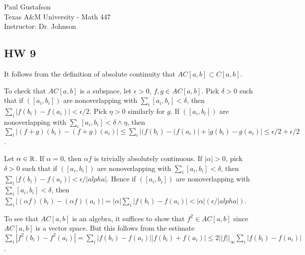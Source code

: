 \documentclass{article}
\begin{document}
\noindent Paul Gustafson\\
\noindent Texas A\&M University - Math 447\\ 
\noindent Instructor: Dr. Johnson

\subsection*{HW 9}
 It follows from the definition of absolute continuity that $AC[a,b] \subset C[a,b]$. 

To check that $AC[a,b]$ is a subspace, let $\epsilon > 0$, $f,g \in AC[a,b]$.  Pick $\delta > 0$ such that if $([a_i,b_i])$ are nonoverlapping with $\sum_i [a_i, b_i] < \delta$, then $\sum_i |f(b_i) - f(a_i)| < \epsilon/2$. Pick $\eta > 0$ similarly for $g$. If $([a_i,b_i])$ are nonoverlapping with $\sum_i [a_i, b_i] < \delta \wedge \eta$, then 
$\sum_i |(f+g)(b_i) - (f+g)(a_i)|
\le \sum_i |(f(b_i) - (f(a_i)| + |g(b_i) - g(a_i)|
\le \epsilon/2 + \epsilon/2$.

Let $\alpha \in \mathbb{R}$. If $\alpha = 0$, then $\alpha f$ is trivially absolutely continuous.  If $|\alpha| > 0$, pick $\delta > 0$ such that if $([a_i,b_i])$ are nonoverlapping with $\sum_i [a_i, b_i] < \delta$, then $\sum_i |f(b_i) - f(a_i)| < \epsilon/|alpha|$.  Hence if $([a_i,b_i])$ are nonoverlapping with $\sum_i [a_i, b_i] < \delta$, then $\sum_i |(\alpha f)(b_i) - (\alpha f)(a_i)| = |\alpha| \sum_i |f(b_i) - f(a_i)| < |\alpha| (\epsilon/|alpha|)$.

To see that $AC[a,b]$ is an algebra, it suffices to show that $f^2 \in AC[a,b]$ since $AC[a,b]$ is a vector space. But this follows from the estimate $\sum_i |f^2(b_i) - f^2(a_i)| = \sum_i |f(b_i) - f(a_i)| |f(b_i) + f(a_i)| \le 2 ||f||_\infty \sum_i |f(b_i) - f(a_i)|$.



\end{document}
